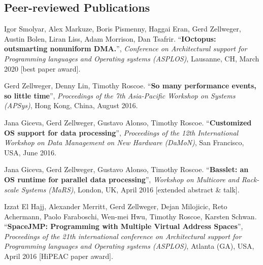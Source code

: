 \documentclass[margin,line]{resume}
\begin{document}
\begin{resume}


\pagebreak

\section{\mysidestyle Peer-reviewed Publications}

Igor Smolyar, Alex Markuze, Boris Pismenny, Haggai Eran, Gerd Zellweger, Austin Bolen, Liran Liss, Adam Morrison, Dan Tsafrir.
``\textbf{IOctopus: outsmarting nonuniform DMA.}'', \textsl{Conference on Architectural support for Programming languages and Operating systems (ASPLOS)}, Lausanne, CH, March 2020 [best paper award].

Gerd Zellweger, Denny Lin, Timothy Roscoe.
``\textbf{So many performance events, so little time}'', \textsl{Proceedings of the 7th Asia-Pacific Workshop on Systems (APSys)}, Hong Kong, China, August 2016.

Jana Giceva, Gerd Zellweger, Gustavo Alonso, Timothy Roscoe.
``\textbf{Customized OS support for data processing}'',
\textsl{Proceedings of the 12th International Workshop on Data Management on New Hardware (DaMoN)}, San Francisco, USA, June 2016.

Jana Giceva, Gerd Zellweger, Gustavo Alonso, Timothy Roscoe.
``\textbf{Basslet: an OS runtime for parallel data processing}'',
\textsl{Workshop on Multicore and Rack-scale Systems (MaRS)}, London, UK, April 2016 [extended abstract \& talk].

Izzat El Hajj, Alexander Merritt, Gerd Zellweger, Dejan Milojicic, Reto Achermann, Paolo Faraboschi, Wen-mei Hwu, Timothy Roscoe, Karsten Schwan.
``\textbf{SpaceJMP: Programming with Multiple Virtual Address Spaces}'',  \textsl{Proceedings of the 21th international conference on Architectural support for Programming languages and Operating systems (ASPLOS)}, Atlanta (GA), USA, April 2016 [HiPEAC paper award].


\end{resume}
\end{document}
